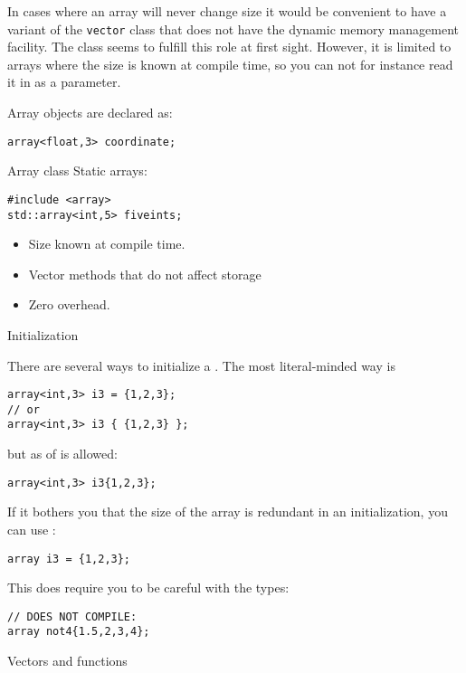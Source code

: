 In cases where an array will never change size it would be convenient
to have a variant of the \lstinline{vector} class that does not have
the dynamic memory management facility.
The  class seems to fulfill this role at first sight.
However, it
is limited to arrays where the size is known at compile time,
so you can not for instance read it in as a parameter.


Array objects are declared as:
\begin{lstlisting}
array<float,3> coordinate;
\end{lstlisting}


\begin{slide}{Array class}
\label{sl:array-class}
Static arrays:
\begin{lstlisting}
#include <array>
std::array<int,5> fiveints;
\end{lstlisting}
\begin{itemize}
\item Size known at compile time.
\item Vector methods that do not affect storage
\item Zero overhead.
\end{itemize}
\end{slide}

 {Initialization}

There are several ways to initialize a .
The most literal-minded way is
\begin{lstlisting}
array<int,3> i3 = {1,2,3};
// or
array<int,3> i3 { {1,2,3} };
\end{lstlisting}
but as of   is allowed:
\begin{lstlisting}
array<int,3> i3{1,2,3};  
\end{lstlisting}
If it bothers you that the size of the array is redundant in an initialization,
you can use  :
\begin{lstlisting}
array i3 = {1,2,3};  
\end{lstlisting}
This does require you to be careful with the types:
\begin{lstlisting}
// DOES NOT COMPILE:
array not4{1.5,2,3,4};
\end{lstlisting}

 {Vectors and functions}

